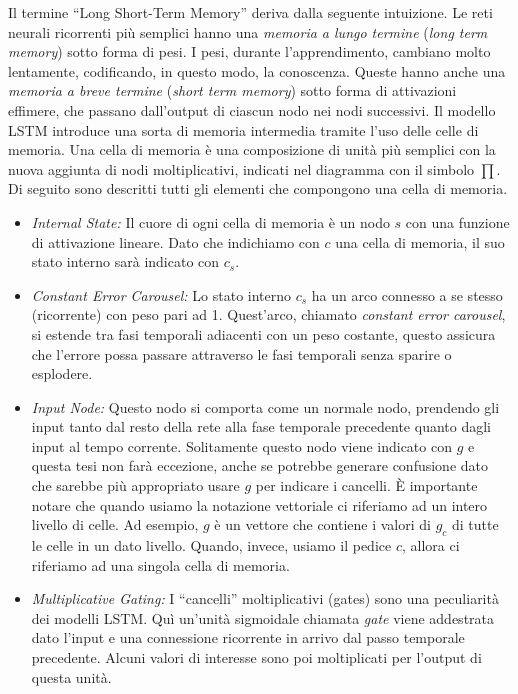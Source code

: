 Il termine ``Long Short-Term Memory'' deriva dalla seguente intuizione.
Le reti neurali ricorrenti pi\`u semplici hanno una \emph{memoria a lungo termine} (\emph{long term memory}) sotto forma di pesi.
I pesi, durante l'apprendimento, cambiano molto lentamente, codificando, in questo modo, la conoscenza.
Queste hanno anche una \emph{memoria a breve termine} (\emph{short term memory}) sotto forma di attivazioni effimere, che passano dall'output di ciascun nodo nei nodi successivi.
Il modello LSTM introduce una sorta di memoria intermedia tramite l'uso delle celle di memoria.
Una cella di memoria \`e una composizione di unit\`a pi\`u semplici con la nuova aggiunta di nodi moltiplicativi, indicati nel diagramma con il simbolo $\prod$.
Di seguito sono descritti tutti gli elementi che compongono una cella di memoria.
\begin{itemize}
  \item \emph{Internal State:} Il cuore di ogni cella di memoria \`e un nodo $s$ con una funzione di attivazione lineare.
  Dato che indichiamo con $c$ una cella di memoria, il suo stato interno sar\`a indicato con $c_s$.
  \item \emph{Constant Error Carousel:} Lo stato interno $c_s$ ha un arco connesso a se stesso (ricorrente) con peso pari ad 1.
  Quest'arco, chiamato \emph{constant error carousel}, si estende tra fasi temporali adiacenti con un peso costante, questo assicura che l'errore possa passare attraverso le fasi temporali senza sparire o esplodere.
  \item \emph{Input Node:} Questo nodo si comporta come un normale nodo, prendendo gli input tanto dal resto della rete alla fase temporale precedente quanto dagli input al tempo corrente.
  Solitamente questo nodo viene indicato con $g$ e questa tesi non far\`a eccezione, anche se potrebbe generare confusione dato che sarebbe pi\`u appropriato usare $g$ per indicare i cancelli.
  \`E importante notare che quando usiamo la notazione vettoriale ci riferiamo ad un intero livello di celle.
  Ad esempio, $g$ \`e un vettore che contiene i valori di $g_c$ di tutte le celle in un dato livello.
  Quando, invece, usiamo il pedice $c$, allora ci riferiamo ad una singola cella di memoria.
  \item \emph{Multiplicative Gating:} I ``cancelli'' moltiplicativi (gates) sono una peculiarit\`a dei modelli LSTM.
  Qu\`i un'unit\`a sigmoidale chiamata \emph{gate} viene addestrata dato l'input e una connessione ricorrente in arrivo dal passo temporale precedente.
  Alcuni valori di interesse sono poi moltiplicati per l'output di questa unit\`a.

\end{itemize}
